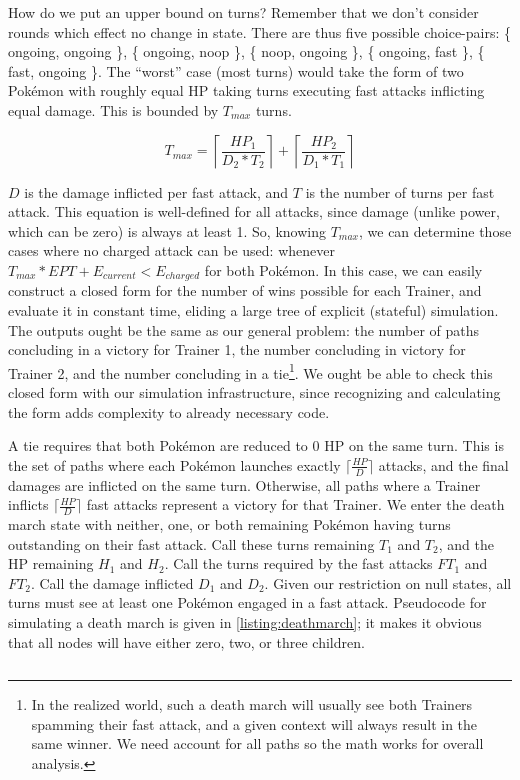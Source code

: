 How do we put an upper bound on turns?
Remember that we don't consider rounds which effect no change in state.
There are thus five possible choice-pairs:
  \{ ongoing, ongoing \},
  \{ ongoing, noop \},
  \{ noop, ongoing \},
  \{ ongoing, fast \},
  \{ fast, ongoing \}.
The ``worst'' case (most turns) would take the form of two Pokémon
  with roughly equal HP taking turns executing fast attacks
  inflicting equal damage.
This is bounded by $T_{max}$ turns.

\[ T_{max} = \left\lceil\frac{HP_1}{D_2 * T_2}\right\rceil + \left\lceil\frac{HP_2}{D_1 * T_1}\right\rceil \]

$D$ is the damage inflicted per fast attack, and $T$ is the number of turns per fast attack.
This equation is well-defined for all attacks, since damage (unlike power,
  which can be zero) is always at least 1.
So, knowing $T_{max}$, we can determine those cases where no charged attack
  can be used: whenever $T_{max} * EPT + E_{current} < E_{charged}$ for both Pokémon.
In this case, we can easily construct a closed form for the number of wins
  possible for each Trainer, and evaluate it in constant time, eliding
  a large tree of explicit (stateful) simulation.
The outputs ought be the same as our general problem: the number of paths
  concluding in a victory for Trainer 1, the number concluding in victory for
  Trainer 2, and the number concluding in a tie\footnote{In the realized world,
  such a death march will usually see both Trainers spamming their fast attack,
  and a given context will always result in the same winner. We need account
  for all paths so the math works for overall analysis.}.
We ought be able to check this closed form with our simulation infrastructure,
  since recognizing and calculating the form adds complexity to
  already necessary code.

A tie requires that both Pokémon are reduced to 0 HP on the same turn.
This is the set of paths where each Pokémon launches exactly $\lceil\frac{HP}{D}\rceil$
  attacks, and the final damages are inflicted on the same turn.
Otherwise, all paths where a Trainer inflicts $\lceil\frac{HP}{D}\rceil$ fast attacks
  represent a victory for that Trainer.
We enter the death march state with neither, one, or both remaining Pokémon having
  turns outstanding on their fast attack.
Call these turns remaining $T_1$ and $T_2$, and the HP remaining $H_1$ and $H_2$.
Call the turns required by the fast attacks $FT_1$ and $FT_2$.
Call the damage inflicted $D_1$ and $D_2$.
Given our restriction on null states, all turns must see at least one Pokémon engaged
  in a fast attack.
Pseudocode for simulating a death march is given in \autoref{listing:deathmarch}; it
  makes it obvious that all nodes will have either zero, two, or three children.
\begin{code}
\label{listing:deathmarch}
\inputminted{cpp}{s/endgame.pcode}
\end{code}

